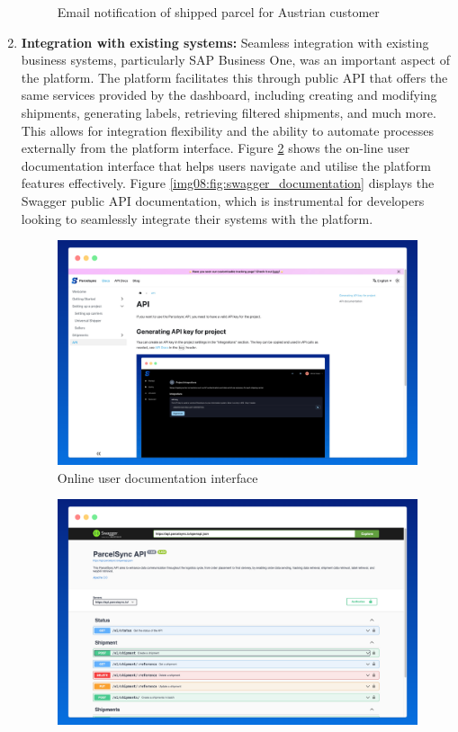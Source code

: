 \begin{enumerate}[label=\bfseries G\arabic*:,leftmargin=*]
\begin{figure}[H]
    \caption{Email notification of shipped parcel for Austrian customer}
    \label{img08:fig:email_notification}
    \end{figure}
    
    \item \textbf{Integration with existing systems:} Seamless integration with existing business systems, particularly SAP Business One, was an important aspect of the platform.
    The platform facilitates this through public API that offers the same services provided by the dashboard, including creating and modifying shipments, generating labels, retrieving filtered shipments, and much more.
    This allows for integration flexibility and the ability to automate processes externally from the platform interface. Figure \ref{img08:fig:user_documentation} shows the on-line user documentation interface that helps users navigate and utilise the platform features effectively. Figure \ref{img08:fig:swagger_documentation} displays the Swagger public API documentation, which is instrumental for developers looking to seamlessly integrate their systems with the platform.
    \begin{figure}[H]\centering
    \includegraphics[width=140mm]{img/chap08/user_documentation.png}
    \caption{Online user documentation interface}
    \label{img08:fig:user_documentation}
    \end{figure}
    \begin{figure}[H]\centering
    \includegraphics[width=140mm]{img/chap08/swagger_documentation.png}

\end{figure}
\end{enumerate}
